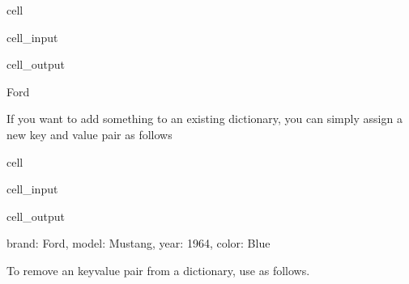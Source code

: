 \documentclass[letterpaper,10pt,english]{jupyterBook}
\begin{document}
\begin{sphinxuseclass}{cell}\begin{sphinxVerbatimInput}

\begin{sphinxuseclass}{cell_input}
\begin{sphinxVerbatim}[commandchars=\\\{\}]
\PYG{p}{[}\PYG{p}{]}
\end{sphinxVerbatim}

\end{sphinxuseclass}\end{sphinxVerbatimInput}
\begin{sphinxVerbatimOutput}

\begin{sphinxuseclass}{cell_output}
\begin{sphinxVerbatim}[commandchars=\\\{\}]
Ford
\end{sphinxVerbatim}

\end{sphinxuseclass}\end{sphinxVerbatimOutput}

\end{sphinxuseclass}
\sphinxAtStartPar
If you want to add something to an existing dictionary, you can simply assign a new key and value pair as follows

\begin{sphinxuseclass}{cell}\begin{sphinxVerbatimInput}

\begin{sphinxuseclass}{cell_input}
\begin{sphinxVerbatim}[commandchars=\\\{\}]
\PYG{p}{[}\PYG{p}{]}  
\end{sphinxVerbatim}

\end{sphinxuseclass}\end{sphinxVerbatimInput}
\begin{sphinxVerbatimOutput}

\begin{sphinxuseclass}{cell_output}
\begin{sphinxVerbatim}[commandchars=\\\{\}]
\PYGZob{}\PYGZsq{}brand\PYGZsq{}: \PYGZsq{}Ford\PYGZsq{}, \PYGZsq{}model\PYGZsq{}: \PYGZsq{}Mustang\PYGZsq{}, \PYGZsq{}year\PYGZsq{}: 1964, \PYGZsq{}color\PYGZsq{}: \PYGZsq{}Blue\PYGZsq{}\PYGZcb{}
\end{sphinxVerbatim}

\end{sphinxuseclass}\end{sphinxVerbatimOutput}

\end{sphinxuseclass}
\sphinxAtStartPar
To remove an key\sphinxhyphen{}value pair from a dictionary, use  as follows.
\end{document}
